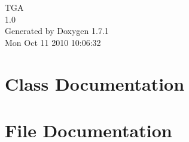 \documentclass[a4paper]{book}
\begin{document}
\begin{titlepage}
\vspace*{7cm}
\begin{center}
{\Large TGA \\[1ex]\large 1.0 }\\
\vspace*{1cm}
{\large Generated by Doxygen 1.7.1}\\
\vspace*{0.5cm}
{\small Mon Oct 11 2010 10:06:32}\\
\end{center}
\end{titlepage}
\clearemptydoublepage
{}
\tableofcontents
\clearemptydoublepage
{}
\chapter{Class Documentation}

























\chapter{File Documentation}












\printindex
\end{document}
